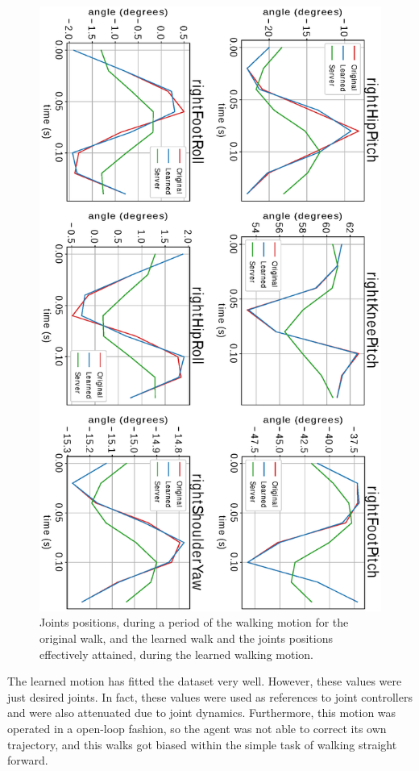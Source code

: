 \begin{figure}[!htbp]
	\centering
	\includegraphics[angle=90,width=1\textwidth]{Cap6/walk_joints_curves}
	\caption{Joints positions, during a period of the walking motion for the original walk, and the learned walk and the joints positions effectively attained, during the learned walking motion.}
	\label{fig:walk_joints_curves}
\end{figure}

The learned motion has fitted the dataset very well. However, these values were just desired joints. In fact, these values were used as references to joint controllers and were also attenuated due to joint dynamics. Furthermore, this motion was operated in a open-loop fashion, so the agent was not able to correct its own trajectory, and this walks got biased within the simple task of walking straight forward.

